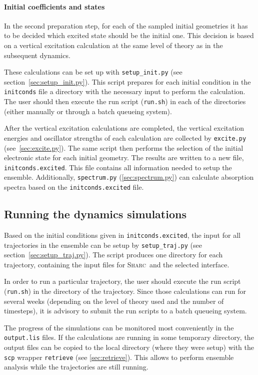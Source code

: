 \documentclass[a4paper,11pt,DIV=15,openany,twoside=false]{scrbook}
\newcommand{\sharc}{\textsc{Sharc}}
\newcommand{\ttt}[1]{\texttt{#1}}
\begin{document}
\paragraph{Initial coefficients and states}

In the second preparation step, for each of the sampled initial geometries it has to be decided which excited state should be the initial one. This decision is based on a vertical excitation calculation at the same level of theory as in the subsequent dynamics. 

These calculations can be set up with \ttt{setup\_init.py} (see section~\ref{sec:setup_init.py}). This script prepares for each initial condition in the \ttt{initconds} file a directory with the necessary input to perform the calculation. The user should then execute the run script (\ttt{run.sh}) in each of the directories (either manually or through a batch queueing system).

After the vertical excitation calculations are completed, the vertical excitation energies and oscillator strengths of each calculation are collected by \ttt{excite.py} (see~\ref{sec:excite.py}). The same script then performs the selection of the initial electronic state for each initial geometry. The results are written to a new file, \ttt{initconds.excited}. This file contains all information needed to setup the ensemble. Additionally, \ttt{spectrum.py} (\ref{sec:spectrum.py}) can calculate absorption spectra based on the \ttt{initconds.excited} file.

\subsection{Running the dynamics simulations}

Based on the initial conditions given in \ttt{initconds.excited}, the input for all trajectories in the ensemble can be setup by \ttt{setup\_traj.py} (see section~\ref{sec:setup_traj.py}). The script produces one directory for each trajectory, containing the input files for \sharc\ and the selected interface.

In order to run a particular trajectory, the user should execute the run script (\ttt{run.sh}) in the directory of the trajectory. Since those calculations can run for several weeks (depending on the level of theory used and the number of timesteps), it is advisory to submit the run scripts to a batch queueing system. 

The progress of the simulations can be monitored most conveniently in the \ttt{output.lis} files. If the calculations are running in some temporary directory, the output files can be copied to the local directory (where they were setup) with the \ttt{scp} wrapper \ttt{retrieve} (see \ref{sec:retrieve}). This allows to perform ensemble analysis while the trajectories are still running.
\end{document}

